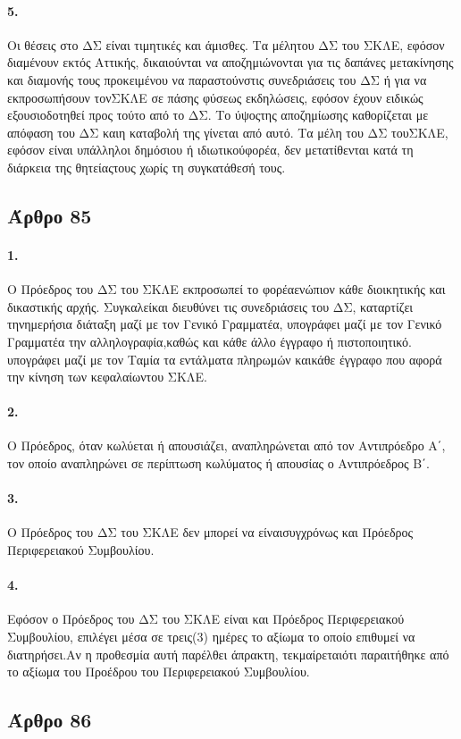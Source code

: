 \documentclass[a4paper,oneside, 10pt]{book}
\begin{document}
\paragraph { 5. } Οι θέσεις στο ΔΣ είναι τιμητικές και άμισθες. Τα μέλητου ΔΣ του ΣΚΛΕ, εφόσον διαμένουν εκτός Αττικής, δικαιούνται να αποζημιώνονται για τις δαπάνες μετακίνησης και διαμονής τους προκειμένου να παραστούνστις συνεδριάσεις του ΔΣ ή για να εκπροσωπήσουν τονΣΚΛΕ σε πάσης φύσεως εκδηλώσεις, εφόσον έχουν ειδικώς εξουσιοδοτηθεί προς τούτο από το ΔΣ. Το ύψοςτης αποζημίωσης καθορίζεται με απόφαση του ΔΣ καιη καταβολή της γίνεται από αυτό. Τα μέλη του ΔΣ τουΣΚΛΕ, εφόσον είναι υπάλληλοι δημόσιου ή ιδιωτικούφορέα, δεν μετατίθενται κατά τη διάρκεια της θητείαςτους χωρίς τη συγκατάθεσή τους.
\subsection*{ Άρθρο 85 }
\paragraph { 1. } Ο Πρόεδρος του ΔΣ του ΣΚΛΕ εκπροσωπεί το φορέαενώπιον κάθε διοικητικής και δικαστικής αρχής. Συγκαλείκαι διευθύνει τις συνεδριάσεις του ΔΣ, καταρτίζει τηνημερήσια διάταξη μαζί με τον Γενικό Γραμματέα, υπογράφει μαζί με τον Γενικό Γραμματέα την αλληλογραφία,καθώς και κάθε άλλο έγγραφο ή πιστοποιητικό. υπογράφει μαζί με τον Ταμία τα εντάλματα πληρωμών καικάθε έγγραφο που αφορά την κίνηση των κεφαλαίωντου ΣΚΛΕ.
\paragraph { 2. } Ο Πρόεδρος, όταν κωλύεται ή απουσιάζει, αναπληρώνεται από τον Αντιπρόεδρο Α΄, τον οποίο αναπληρώνει σε περίπτωση κωλύματος ή απουσίας ο Αντιπρόεδρος Β΄.
\paragraph { 3. } Ο Πρόεδρος του ΔΣ του ΣΚΛΕ δεν μπορεί να είναισυγχρόνως και Πρόεδρος Περιφερειακού Συμβουλίου.
\paragraph { 4. } Εφόσον ο Πρόεδρος του ΔΣ του ΣΚΛΕ είναι και Πρόεδρος Περιφερειακού Συμβουλίου, επιλέγει μέσα σε τρεις(3) ημέρες το αξίωμα το οποίο επιθυμεί να διατηρήσει.Αν η προθεσμία αυτή παρέλθει άπρακτη, τεκμαίρεταιότι παραιτήθηκε από το αξίωμα του Προέδρου του Περιφερειακού Συμβουλίου.
\subsection*{ Άρθρο 86 }
\end{document}
